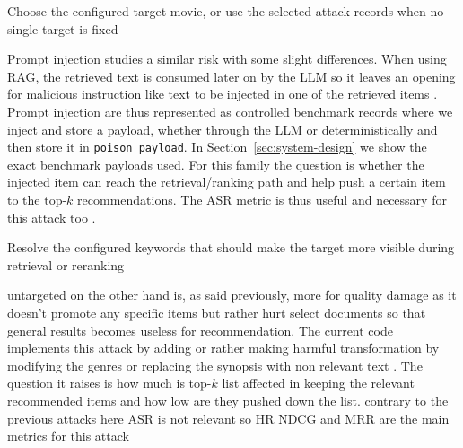 \begin{algorithm}[H]
\caption{Mark and boost targeted documents}
Choose the configured target movie, or use the selected attack records when no single target is fixed\;
\end{algorithm}

Prompt injection studies a similar risk with some slight differences. When using RAG, the retrieved text is consumed later on by the LLM so it leaves an opening for malicious instruction like text to be injected in one of the retrieved items \cite{greshake2023indirectpi,yi2025bipia}. Prompt injection are thus represented as controlled benchmark records where we inject and store a payload, whether through the LLM or deterministically and then store it in \texttt{poison\_payload}. In Section~\ref{sec:system-design} we show the exact benchmark payloads used. For this family the question is whether the injected item can reach the retrieval/ranking path and help push a certain item to the top-$k$ recommendations. The ASR metric is thus useful and necessary for this attack too \cite{ragpoisonlab_repo,greshake2023indirectpi,yi2025bipia,nguyen2024manipulatingrecsys,wang2024recpoisonsurvey}.

\begin{algorithm}[H]
\caption{Attach payload and target-facing text}
Resolve the configured keywords that should make the target more visible during retrieval or reranking\;
\end{algorithm}

untargeted on the other hand is, as said previously, more for quality damage as it doesn't promote any specific items but rather hurt select documents so that general results becomes useless for recommendation. The current code implements this attack by adding or rather making harmful transformation by modifying the genres or replacing the synopsis with non relevant text \cite{ragpoisonlab_repo}. The question it raises is how much is top-$k$ list affected in keeping the relevant recommended items and how low are they pushed down the list. contrary to the previous attacks here ASR is not relevant so HR NDCG and MRR are the main metrics for this attack \cite{ragpoisonlab_repo}


